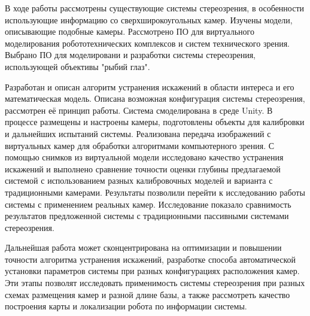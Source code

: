 
В ходе работы рассмотрены существующие системы стереозрения, в особенности использующие информацию
со сверхширокоугольных камер. Изучены модели, описывающие подобные камеры. Рассмотрено ПО для виртуального
 моделирования робототехнических комплексов и систем технического зрения. Выбрано ПО для моделировани и 
разработки системы стереозрения, использующей объективы "рыбий глаз". 

Разработан и описан алгоритм устранения искажений в области интереса и его математическая модель.   %
Описана возможная конфигурация системы стереозрения, рассмотрен её принцип работы. Система 
 смоделирована в среде Unity. В процессе размещены и настроены камеры, подготовлены объекты для калибровки и 
дальнейших испытаний системы. Реализована передача изображений с виртуальных камер для обработки алгоритмами
компьютерного зрения. С помощью снимков из виртуальной модели исследовано качество устранения искажений и выполнено
 сравнение точности оценки глубины предлагаемой системой с использованием разных калибровочных моделей и варианта
с традиционными камерами. Результаты позволили перейти к исследованию работы системы с применением реальных камер.  
Исследование показало сравнимость результатов предложенной системы с традиционными пассивными системами стереозрения. %

Дальнейшая работа может сконцентрирована на оптимизации и повышении точности алгоритма устранения искажений,
разработке способа автоматической установки параметров системы при разных конфигурациях расположения камер. 
Эти этапы позволят исследовать применимость системы стереозрения при  разных схемах размещения камер и разной 
длине базы, а также рассмотреть качество построения карты и локализации робота по информации системы. 